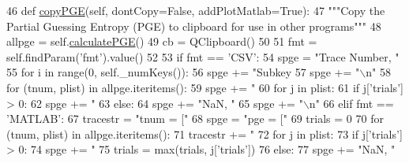 \begin{DoxyCode}
46     \textcolor{keyword}{def }\hyperlink{classsoftware_1_1chipwhisperer_1_1common_1_1results_1_1pgevstraceplot_1_1PGEVsTrace_a8a9d71b5b6a422510d16b0da496a29f0}{copyPGE}(self, dontCopy=False, addPlotMatlab=True):
47         \textcolor{stringliteral}{"""Copy the Partial Guessing Entropy (PGE) to clipboard for use in other programs"""}
48         allpge = self.\hyperlink{classsoftware_1_1chipwhisperer_1_1common_1_1results_1_1pgevstraceplot_1_1PGEVsTrace_ad1074cc8b19ffa1cc7cc156b4d7799f9}{calculatePGE}()
49         cb = QClipboard()
50 
51         fmt = self.findParam(\textcolor{stringliteral}{'fmt'}).value()
52 
53         \textcolor{keywordflow}{if} fmt == \textcolor{stringliteral}{'CSV'}:
54             spge = \textcolor{stringliteral}{"Trace Number, "}
55             \textcolor{keywordflow}{for} i \textcolor{keywordflow}{in} range(0, self.\_numKeys()):
56                 spge += \textcolor{stringliteral}{"Subkey %
57             spge += \textcolor{stringliteral}{"\(\backslash\)n"}
58             \textcolor{keywordflow}{for} (tnum, plist) \textcolor{keywordflow}{in} allpge.iteritems():
59                 spge += \textcolor{stringliteral}{"%
60                 \textcolor{keywordflow}{for} j \textcolor{keywordflow}{in} plist:
61                     \textcolor{keywordflow}{if} j[\textcolor{stringliteral}{'trials'}] > 0:
62                         spge += \textcolor{stringliteral}{"%
63                     \textcolor{keywordflow}{else}:
64                         spge += \textcolor{stringliteral}{"NaN, "}
65                 spge += \textcolor{stringliteral}{"\(\backslash\)n"}
66         \textcolor{keywordflow}{elif} fmt == \textcolor{stringliteral}{'MATLAB'}:
67             tracestr = \textcolor{stringliteral}{"tnum = ["}
68             spge = \textcolor{stringliteral}{"pge = ["}
69             trials = 0
70             \textcolor{keywordflow}{for} (tnum, plist) \textcolor{keywordflow}{in} allpge.iteritems():
71                 tracestr += \textcolor{stringliteral}{"%
72                 \textcolor{keywordflow}{for} j \textcolor{keywordflow}{in} plist:
73                     \textcolor{keywordflow}{if} j[\textcolor{stringliteral}{'trials'}] > 0:
74                         spge += \textcolor{stringliteral}{"%
75                         trials = max(trials, j[\textcolor{stringliteral}{'trials'}])
76                     \textcolor{keywordflow}{else}:
77                         spge += \textcolor{stringliteral}{"NaN, "}
}}}}}
\end{DoxyCode}
